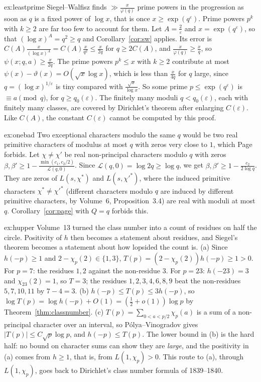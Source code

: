 \begin{solution}{ex:leastprime}
\idea Siegel--Walfisz finds $\gg\frac x{\varphi(q)}$ prime powers in the progression as soon as $q$ is a fixed power of $\log x$, that is once $x\ge\exp(q^{\varepsilon})$. Prime powers $p^k$ with $k\ge2$ are far too few to account for them.
\writeup Let $A=\frac2\varepsilon$ and $x=\exp(q^{\varepsilon})$, so that $(\log x)^A=q^2\ge q$ and Corollary~\ref{cor:sw} applies. Its error is $C(A)\frac x{(\log x)^A}=C(A)\frac x{q^2}\le\frac x{2q}$ for $q\ge2C(A)$, and $\frac x{\varphi(q)}\ge\frac xq$, so $\psi(x;q,a)\ge\frac x{2q}$.
The prime powers $p^k\le x$ with $k\ge2$ contribute at most $\psi(x)-\vartheta(x)=O(\sqrt x\log x)$, which is less than $\frac x{4q}$ for $q$ large, since $q=(\log x)^{1/\varepsilon}$ is tiny compared with $\frac{\sqrt x}{\log x}$. So some prime $p\le\exp(q^\varepsilon)$ is $\equiv a\pmod q$, for $q\ge q_0(\varepsilon)$. The finitely many moduli $q<q_0(\varepsilon)$, each with finitely many classes, are covered by Dirichlet's theorem after enlarging $C(\varepsilon)$. Like $C(A)$, the constant $C(\varepsilon)$ cannot be computed by this proof.
\end{solution}

\begin{solution}{ex:onebad}
\idea Two exceptional characters modulo the same $q$ would be two real primitive characters of modulus at most $q$ with zeros very close to $1$, which Page forbids.
\writeup Let $\chi\ne\chi'$ be real non-principal characters modulo $q$ with zeros $\beta,\beta'\ge1-\frac{\min(c_1,c_2/2)}{\mathcal L(q,0)}$. Since $\mathcal L(q,0)=\log2q\ge\log q$, we get $\beta,\beta'\ge1-\frac{c_2}{2\log q}$. They are zeros of $L(s,\chi^*)$ and $L(s,\chi'^*)$, where the induced primitive characters $\chi^*\ne\chi'^*$ (different characters modulo $q$ are induced by
different primitive characters, by Volume~6, Proposition~3.4) are real with moduli at most $q$. Corollary~\ref{cor:page} with $Q=q$ forbids this.
\end{solution}

\begin{solution}{ex:hupper}
\idea Volume~13 turned the class number into a count of residues on half the circle. Positivity of $h$ then becomes a statement about residues, and Siegel's theorem becomes a statement about how lopsided the count is.
\writeup (a) Since $h(-p)\ge1$ and $2-\chi_p(2)\in\{1,3\}$, $T(p)=(2-\chi_p(2))h(-p)\ge1>0$. For $p=7$: the residues $1,2$ against the non-residue $3$. For $p=23$: $h(-23)=3$ and $\chi_{23}(2)=1$, so $T=3$; the residues $1,2,3,4,6,8,9$ beat the non-residues $5,7,10,11$ by $7-4=3$.
(b) $h(-p)\le T(p)\le3h(-p)$, so $\log T(p)=\log h(-p)+O(1)=(\frac12+o(1))\log p$ by Theorem~\ref{thm:classnumber}.
(c) $T(p)=\sum_{0<a<p/2}\chi_p(a)$ is a sum of a non-principal character over an interval, so Pólya--Vinogradov gives $|T(p)|\le C\sqrt p\log p$, and $h(-p)\le T(p)$. The lower bound in (b) is the hard half: no bound on character sums can show they are \emph{large}, and the positivity in (a) comes from $h\ge1$, that is, from $L(1,\chi_p)>0$. This route to (a), through $L(1,\chi_p)$, goes back to Dirichlet's class number formula of 1839--1840.
\end{solution}


